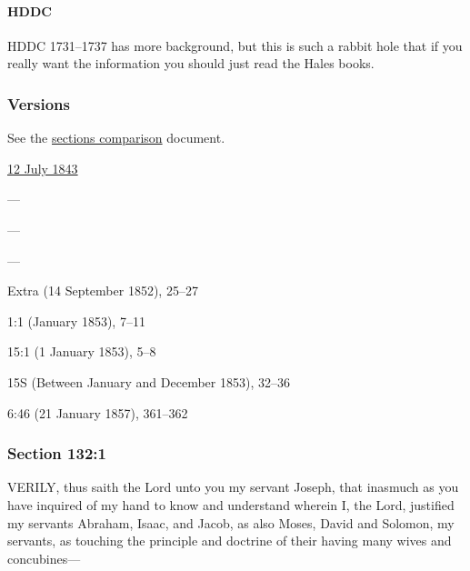 		\paragraph{HDDC}
		
			HDDC 1731--1737 has more background, but this is such a rabbit hole that if you really want the information you should just read the Hales books.
			
	\subsubsection{Versions}
		\label{DC132-V}
		
		See the \href{https://drive.google.com/file/d/1goAvNz8jS4R8slYfMG_db55Ty2z_vmgK/view?usp=sharing}{sections comparison} document.
	
		\begin{compactdesc}
			\item[JSP] \hyperref[EMS-1843-JS-12-JUL-1843]{12 July 1843}
			\item[BC] ---
			\item[DC 1835] ---
			\item[DC 1844] ---
			\item[DN] Extra (14 September 1852), 25--27
			\item[SEER] 1:1 (January 1853), 7--11
			\item[MS] 15:1 (1 January 1853), 5--8
			\item[MS] 15S (Between January and December 1853), 32--36
			\item[DN] 6:46 (21 January 1857), 361--362
		\end{compactdesc}

	\subsubsection{Section 132:1} %
		\label{DC132-1}

		VERILY, thus saith the Lord unto you my servant Joseph, that inasmuch as you have inquired of my hand to know and understand wherein I, the Lord, justified my servants Abraham, Isaac, and Jacob, as also Moses, David and Solomon, my servants, as touching the principle and doctrine of their having many wives and concubines---



